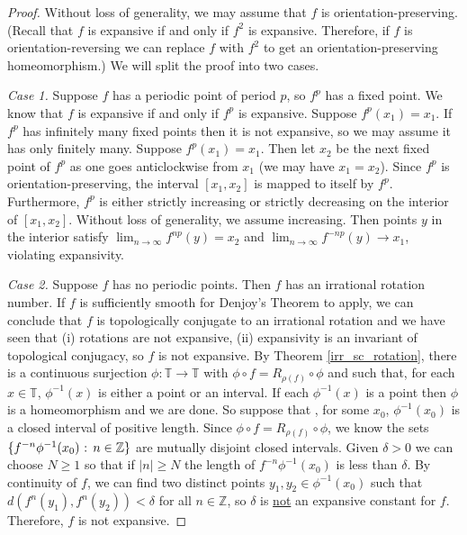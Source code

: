 \documentclass[12pt]{article}
\theoremstyle{definition}
\theoremstyle{remark}
\begin{document}
\begin{proof}
Without loss of generality, we may assume that $f$ is orientation-preserving.
(Recall that $f$ is expansive if and only if $f^2$ is expansive. Therefore, if $f$ is orientation-reversing we can replace $f$ with $f^2$ to get an orientation-preserving homeomorphism.)
We will split the proof into two cases.

\medskip
\noindent
{\it Case 1.} Suppose $f$ has a periodic point of period $p$, so $f^p$ has a fixed point.
We know that $f$ is expansive if and only if $f^p$ is expansive. Suppose $f^p(x_1)=x_1$.
If $f^p$ has infinitely many fixed points then it is not expansive, so we may assume it has only finitely many. Suppose $f^p(x_1)=x_1$. Then let $x_2$ be the next fixed point of $f^p$
as one goes anticlockwise from $x_1$ (we may have $x_1=x_2$).
Since $f^p$ is orientation-preserving, the interval $[x_1,x_2]$ is mapped to itself by $f^p$.
Furthermore, $f^p$ is either strictly increasing or strictly decreasing on the interior of $[x_1,x_2]$.
Without loss of generality, we assume increasing.
Then points $y$ in the interior satisfy
 $\lim_{n \to \infty}f^{np}(y) =x_2$ and $\lim_{n \to \infty} f^{-np}(y) \to x_1$, violating expansivity.
 
 \medskip
 \noindent
 {\it Case 2.} Suppose $f$ has no periodic points. Then $f$ has an irrational rotation number. 
 If $f$ is sufficiently smooth for Denjoy's Theorem to apply, we can conclude that $f$ is topologically
 conjugate to an irrational rotation and we have seen that (i) rotations are not expansive, (ii)
 expansivity is an invariant of topological conjugacy, so $f$ is not expansive. 
 By Theorem \ref{irr_sc_rotation},
 there is a continuous surjection $\phi :\mathbb T \to \mathbb T$ with $\phi \circ f = R_{\rho(f)}
 \circ \phi$ and such that, for each $x \in \mathbb T$, $\phi^{-1}(x)$ is either a point or an interval.
 If each $\phi^{-1}(x)$ is a point then $\phi$ is a homeomorphism and we are done. 
 So suppose that , for some $x_0$, $\phi^{-1}(x_0)$ is a closed interval of positive length.
 Since $\phi \circ f = R_{\rho(f)} \circ \phi$, we know the sets
 $\{f^{-n}\phi^{-1}(x_0) \hbox{ : } n \in \mathbb Z\}$ are mutually disjoint closed intervals.
 Given $\delta>0$ we can choose $N \ge 1$ so that if $|n|\ge N$ the length of 
 $f^{-n} \phi^{-1}(x_0)$ is less than $\delta$.
 By continuity of $f$, we can find two distinct points $y_1,y_2 \in \phi^{-1}(x_0)$ such that
 $d(f^n(y_1),f^n(y_2)) < \delta$ for all $n \in \mathbb Z$, so $\delta$ is \underline{not}
 an expansive constant for $f$. Therefore, $f$ is not expansive.
\end{proof}
\end{document}
